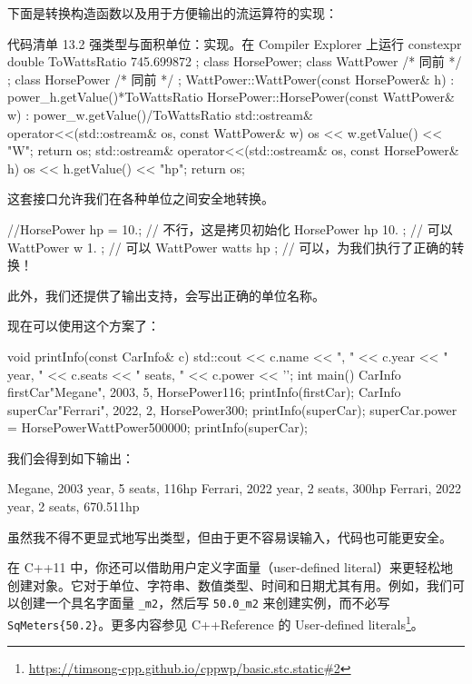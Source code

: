下面是转换构造函数以及用于方便输出的流运算符的实现：

\begin{codeboxt}[cpp]{代码清单 13.2 强类型与面积单位：实现。在 Compiler Explorer 上运行}
constexpr double ToWattsRatio { 745.699872 };
class HorsePower;
class WattPower { /* 同前 */ };
class HorsePower { /* 同前 */ };
WattPower::WattPower(const HorsePower& h)
: power_{h.getValue()*ToWattsRatio} { }
HorsePower::HorsePower(const WattPower& w)
: power_{w.getValue()/ToWattsRatio} { }
std::ostream& operator<<(std::ostream& os, const WattPower& w) {
os << w.getValue() << "W";
return os;
}
std::ostream& operator<<(std::ostream& os, const HorsePower& h) {
os << h.getValue() << "hp";
return os;
}
\end{codeboxt}

这套接口允许我们在各种单位之间安全地转换。

\begin{codebox}[cpp]
//HorsePower hp = 10.; // 不行，这是拷贝初始化
HorsePower hp{ 10. }; // 可以
WattPower w { 1. }; // 可以
WattPower watts { hp }; // 可以，为我们执行了正确的转换！
\end{codebox}

此外，我们还提供了输出支持，会写出正确的单位名称。

现在可以使用这个方案了：

\begin{codebox}[cpp]
void printInfo(const CarInfo& c) {
std::cout << c.name << ", "
<< c.year << " year, "
<< c.seats << " seats, "
<< c.power << '\n';
}
int main() {
CarInfo firstCar{"Megane", 2003, 5, HorsePower{116}};
printInfo(firstCar);
CarInfo superCar{"Ferrari", 2022, 2, HorsePower{300}};
printInfo(superCar);
superCar.power = HorsePower{WattPower{500000}};
printInfo(superCar);
}
\end{codebox}

我们会得到如下输出：

\begin{codebox}[cpp]
Megane, 2003 year, 5 seats, 116hp
Ferrari, 2022 year, 2 seats, 300hp
Ferrari, 2022 year, 2 seats, 670.511hp
\end{codebox}

虽然我不得不更显式地写出类型，但由于更不容易误输入，代码也可能更安全。

\begin{myInfoBox}
在 C++11 中，你还可以借助用户定义字面量（user-defined literal）来更轻松地创建对象。它对于单位、字符串、数值类型、时间和日期尤其有用。例如，我们可以创建一个具名字面量 \texttt{\_m2}，然后写 \texttt{50.0\_m2} 来创建实例，而不必写 \texttt{SqMeters\{50.2\}}。更多内容参见 C++Reference 的 User-defined literals\footnote{\url{https://timsong-cpp.github.io/cppwp/basic.stc.static\#2}}。
\end{myInfoBox}

